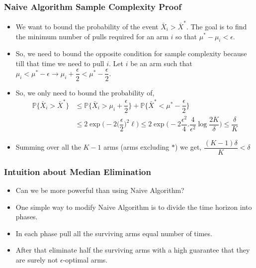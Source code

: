 \begin{frame}
\frametitle{Naive Algorithm Sample Complexity Proof}
\begin{itemize}
\item<1-> We want to bound the probability of the event $\bar{X}_i > \bar{X}^* $. The goal is to find the minimum number of pulls required for an arm $i$ so that $\mu^{*}-\mu_i < \epsilon$.
\item<2-> So, we need to bound the opposite condition for sample complexity because till that time we need to pull $i$. Let $i$ be an arm such that $\mu_i<\mu^* - \epsilon \rightarrow \mu_i + \dfrac{\epsilon}{2} <\mu^* - \dfrac{\epsilon}{2}$.
\item<3-> So, we only need to bound the probability of, 
\begin{align*}
\mathbb{P}\lbrace\bar{X}_i > \bar{X}^* \rbrace &\leq \mathbb{P}\bigg\lbrace \bar{X}_i > \mu_i + \dfrac{\epsilon}{2}\bigg\rbrace + \mathbb{P}\bigg\lbrace \bar{X}^* < \mu^* - \dfrac{\epsilon}{2}\bigg\rbrace\\
&\leq 2\exp\bigg(-2\big (\dfrac{\epsilon}{2}\big)^{2}\ell\bigg)\leq 2\exp\bigg(-2\dfrac{\epsilon^2}{4}. \dfrac{4}{\epsilon^{2}}\log \dfrac{2K}{\delta} \bigg)\leq \dfrac{\delta}{K}
\end{align*}
\item<4-> Summing over all the $K-1$ arms (arms excluding $*$) we get, $\dfrac{(K-1)\delta}{K}< \delta$
\end{itemize}
\end{frame}

\begin{frame}
\frametitle{Intuition about Median Elimination}
\begin{itemize}
\item<1-> Can we be more powerful than using Naive Algorithm?
\item<2-> One simple way to modify Naive Algorithm is to divide the time horizon into phases.
\item<3-> In each phase pull all the surviving arms equal number of times.
\item<4-> After that eliminate half the surviving arms with a high guarantee that they are surely not $\epsilon$-optimal arms.
\end{itemize}
\end{frame}

